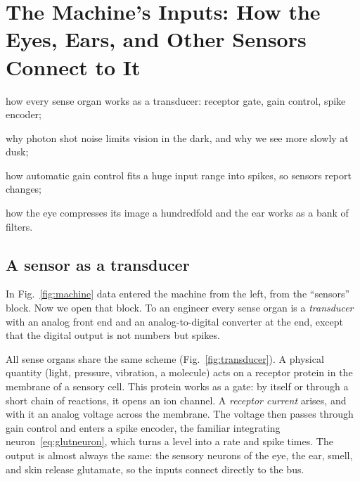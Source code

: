 \chapter{The Machine's Inputs: How the Eyes, Ears, and Other Sensors Connect to It}
\label{sec:sensors}
\begin{chaptergoals}
\item how every sense organ works as a transducer: receptor gate, gain control, spike encoder;
\item why photon shot noise limits vision in the dark, and why we see more slowly at dusk;
\item how automatic gain control fits a huge input range into spikes, so sensors report changes;
\item how the eye compresses its image a hundredfold and the ear works as a bank of filters.
\end{chaptergoals}

\section{A sensor as a transducer}

In Fig.~\ref{fig:machine} data entered the machine from the left, from the ``sensors'' block. Now we open that block. To an engineer every sense organ is a \emph{transducer} with an analog front end and an analog-to-digital converter at the end, except that the digital output is not numbers but spikes.

All sense organs share the same scheme (Fig.~\ref{fig:transducer}). A physical quantity (light, pressure, vibration, a molecule) acts on a receptor protein in the membrane of a sensory cell. This protein works as a gate: by itself or through a short chain of reactions, it opens an ion channel. A \emph{receptor current} arises, and with it an analog voltage across the membrane. The voltage then passes through gain control and enters a spike encoder, the familiar integrating neuron~\eqref{eq:glutneuron}, which turns a level into a rate and spike times. The output is almost always the same: the sensory neurons of the eye, the ear, smell, and skin release glutamate, so the inputs connect directly to the  bus.

